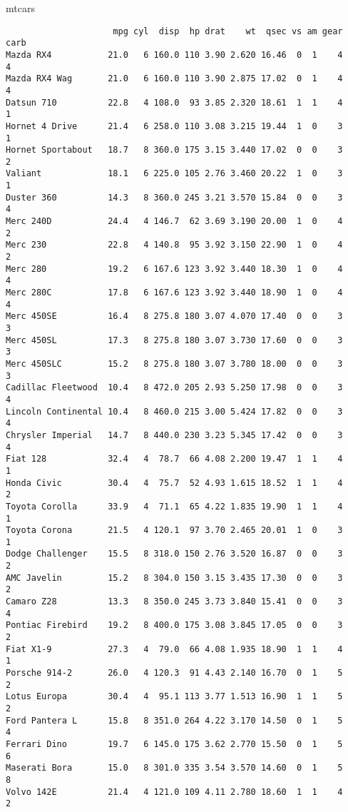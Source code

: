 \documentclass[
  letterpaper,
  DIV=11,
  numbers=noendperiod]{scrartcl}
\newenvironment{Shaded}{\begin{snugshade}}{\end{snugshade}}
\newcommand{\NormalTok}[1]{\textcolor[rgb]{0.00,0.23,0.31}{#1}}
\begin{document}
\begin{Shaded}
\begin{Highlighting}[]
\NormalTok{mtcars }
\end{Highlighting}
\end{Shaded}

\begin{verbatim}
                     mpg cyl  disp  hp drat    wt  qsec vs am gear carb
Mazda RX4           21.0   6 160.0 110 3.90 2.620 16.46  0  1    4    4
Mazda RX4 Wag       21.0   6 160.0 110 3.90 2.875 17.02  0  1    4    4
Datsun 710          22.8   4 108.0  93 3.85 2.320 18.61  1  1    4    1
Hornet 4 Drive      21.4   6 258.0 110 3.08 3.215 19.44  1  0    3    1
Hornet Sportabout   18.7   8 360.0 175 3.15 3.440 17.02  0  0    3    2
Valiant             18.1   6 225.0 105 2.76 3.460 20.22  1  0    3    1
Duster 360          14.3   8 360.0 245 3.21 3.570 15.84  0  0    3    4
Merc 240D           24.4   4 146.7  62 3.69 3.190 20.00  1  0    4    2
Merc 230            22.8   4 140.8  95 3.92 3.150 22.90  1  0    4    2
Merc 280            19.2   6 167.6 123 3.92 3.440 18.30  1  0    4    4
Merc 280C           17.8   6 167.6 123 3.92 3.440 18.90  1  0    4    4
Merc 450SE          16.4   8 275.8 180 3.07 4.070 17.40  0  0    3    3
Merc 450SL          17.3   8 275.8 180 3.07 3.730 17.60  0  0    3    3
Merc 450SLC         15.2   8 275.8 180 3.07 3.780 18.00  0  0    3    3
Cadillac Fleetwood  10.4   8 472.0 205 2.93 5.250 17.98  0  0    3    4
Lincoln Continental 10.4   8 460.0 215 3.00 5.424 17.82  0  0    3    4
Chrysler Imperial   14.7   8 440.0 230 3.23 5.345 17.42  0  0    3    4
Fiat 128            32.4   4  78.7  66 4.08 2.200 19.47  1  1    4    1
Honda Civic         30.4   4  75.7  52 4.93 1.615 18.52  1  1    4    2
Toyota Corolla      33.9   4  71.1  65 4.22 1.835 19.90  1  1    4    1
Toyota Corona       21.5   4 120.1  97 3.70 2.465 20.01  1  0    3    1
Dodge Challenger    15.5   8 318.0 150 2.76 3.520 16.87  0  0    3    2
AMC Javelin         15.2   8 304.0 150 3.15 3.435 17.30  0  0    3    2
Camaro Z28          13.3   8 350.0 245 3.73 3.840 15.41  0  0    3    4
Pontiac Firebird    19.2   8 400.0 175 3.08 3.845 17.05  0  0    3    2
Fiat X1-9           27.3   4  79.0  66 4.08 1.935 18.90  1  1    4    1
Porsche 914-2       26.0   4 120.3  91 4.43 2.140 16.70  0  1    5    2
Lotus Europa        30.4   4  95.1 113 3.77 1.513 16.90  1  1    5    2
Ford Pantera L      15.8   8 351.0 264 4.22 3.170 14.50  0  1    5    4
Ferrari Dino        19.7   6 145.0 175 3.62 2.770 15.50  0  1    5    6
Maserati Bora       15.0   8 301.0 335 3.54 3.570 14.60  0  1    5    8
Volvo 142E          21.4   4 121.0 109 4.11 2.780 18.60  1  1    4    2
\end{verbatim}
\end{document}
